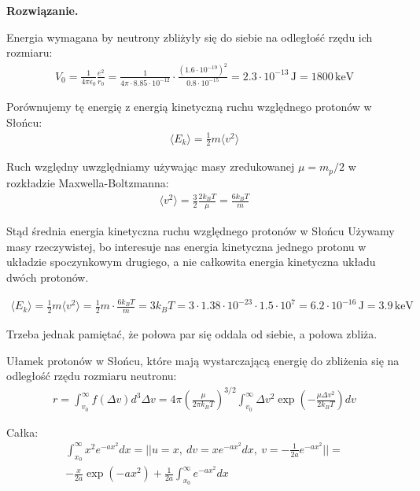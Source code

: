\documentclass[11pt,a4paper]{article}
\newenvironment{solution}{\vspace{1cm} \par\textbf{Rozwiązanie.} \vspace{1cm}}{}
\begin{document}
\begin{solution}

Energia wymagana by neutrony zbliżyły się do siebie na odległość rzędu ich rozmiaru:
\begin{align*}
V_0 = \frac{1}{4\pi \epsilon_0} \frac{e^2}{r_{0}} = \frac{1}{4\pi \cdot 8.85 \cdot 10^{-12}} \cdot \frac{(1
.6 \cdot 10^{-19})^2}{0.8 \cdot 10^{-15}} = 2.3 \cdot 10^{-13}\,\text{J} = 1800\,\text{keV}
\end{align*}

Porównujemy tę energię z energią kinetyczną ruchu względnego protonów w Słońcu:
\begin{align*}
\langle E_k \rangle = \frac{1}{2} m \langle v^{2} \rangle
\end{align*}

Ruch względny uwzględniamy używając masy zredukowanej $\mu = m_p / 2$ w 
rozkładzie Maxwella-Boltzmanna:
\begin{align*}
\langle v^{2} \rangle = \frac{3}{2} \frac{2 k_B T}{\mu} = \frac{6 k_B T}{m}
\end{align*}

Stąd średnia energia kinetyczna ruchu względnego protonów w Słońcu
Używamy masy rzeczywistej, bo interesuje nas energia kinetyczna jednego protonu w układzie spoczynkowym drugiego,
a nie całkowita energia kinetyczna układu dwóch protonów.

\begin{align*}
\langle E_k \rangle = \frac{1}{2} m \langle v^{2} \rangle = 
\frac{1}{2} m \cdot \frac{6 k_B T}{m} = 3 k_B T = 
3 \cdot 1.38 \cdot 10^{-23} \cdot 1.5 \cdot 10^7 = 6.2 \cdot 10^{-16}\,\text{J} = 3.9\,\text{keV}
\end{align*}

Trzeba jednak pamiętać, że połowa par się oddala od siebie, a połowa zbliża.


Ułamek protonów w Słońcu, które mają wystarczającą energię do zbliżenia się 
na odległość rzędu rozmiaru neutronu:
\begin{align*}
r = \int_{v_0}^\infty f(\Delta v) d^{3} \Delta v = 
4\pi \left( \frac{\mu}{2\pi k_B T} \right)^{3/2} 
\int_{v_0}^\infty \Delta v^2 \exp\left( -\frac{\mu \Delta v^2}{2 k_B T} \right) dv
\end{align*} 

Całka:
\begin{align*}
  \int_{x_0}^\infty x^2 e^{-a x^2} dx = || u = x,~ dv = x e^{-a x^2} dx, ~ v = -\frac{1}{2a} e^{-a x^2} || = \\
  -\frac{x}{2a}\exp(-a x^2) + \frac{1}{2a} \int_{x_0}^\infty e^{-a x^2} dx 
\end{align*}


\end{solution}
\end{document}
